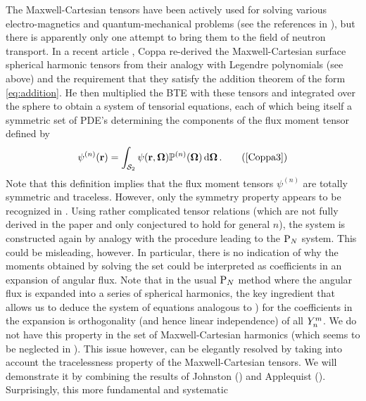 The Maxwell-Cartesian tensors have been actively used for solving various electro-magnetics and quantum-mechanical
problems (see the references in \cite{Applequist2}), but there is apparently only one attempt to bring them to the field
of neutron transport. In a recent article \cite{Coppa3}, Coppa re-derived the Maxwell-Cartesian surface spherical
harmonic tensors from their analogy with Legendre polynomials (see above) and the requirement that they satisfy the
addition theorem of the form \eqref{eq:addition}. He then multiplied the BTE with these tensors and integrated over the
sphere to obtain a system of tensorial equations, each of which being itself a symmetric set of PDE's determining the
components of the flux moment tensor defined by
\begin{equation*}
  \psi^{(n)}(\br) = \intA{\psi(\br,\bomega)\PP[n](\bomega)}.\tag{\cite[Eqn. (42)]{Coppa3}}
\end{equation*}
Note that this definition implies that the flux moment tensors $\psi^{(n)}$ are totally symmetric and traceless. 
However, only the symmetry property appears to be recognized in \cite{Coppa3}. Using rather complicated tensor relations 
(which are not fully derived in the paper and only conjectured to hold for general $n$), the system is constructed again 
by analogy with the procedure leading to the $\text{P}_{N}$ system. This could be misleading, however. In particular, there is 
no indication of why the moments obtained by solving the set could be interpreted as coefficients in an expansion of 
angular flux. Note that in the usual $\text{P}_{N}$ method where the angular flux is expanded into a series of spherical 
harmonics, the key ingredient that allows us to deduce 
the system of equations analogous to \cite[Eqn. (48)]{Coppa3}) for the coefficients in the expansion is orthogonality 
(and hence linear independence) of all $Y_{n}^{m}$. We do not have this property in the set of Maxwell-Cartesian 
harmonics (which seems to be neglected in \cite{Coppa3}). This issue however, can be elegantly resolved by taking into 
account the tracelessness property of the Maxwell-Cartesian tensors. We will demonstrate it by combining the results of 
Johnston (\cite{Johnston1}) and Applequist (\cite{Applequist1}). Surprisingly, this more fundamental and systematic 
